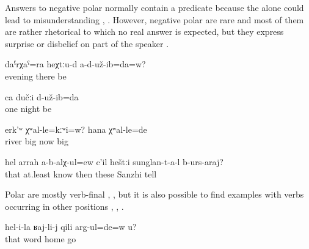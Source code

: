 Answers to negative polar  normally contain a predicate because the  alone could lead to misunderstanding , . However, negative polar  are rare and most of them are rather rhetorical  to which no real answer is expected, but they express surprise or disbelief on part of the speaker . 
%
\begin{exe}
	\ex	\label{ex:Did you not also spend the night there? We stayed one night}
	\begin{xlist}
		\ex	\label{ex:Did you not also spend the night there? We stayed one night@A}
		\gll	daˁrχaˁ=ra	heχtːu-d	a-d-už-ib=da=w?\\
			evening	there	be\\
		\glt	{}

		\ex	\label{ex:Did you not also spend the night there? We stayed one night@B}
		\gll	ca	dučːi	d-už-ib=da\\
			one	night	be\\
		\glt	{}
	\end{xlist}

	\ex	\label{ex:Was the river not big? Now it was big}
	\gll	erk'ʷ	χʷal-le=kːʷi=w? 	hana	χʷal-le=de\\
		river	big 	now	big\\
	\glt	{}

	\ex	\label{ex:‎Don't the Sanzhi people know at least that (story) to tell}
	\gll	hel	arrah	a-b-alχ-ul=ew	c'il	heštːi	sunglan-t-a-l	b-urs-araj?\\
		that	at.least	know	then	these	Sanzhi	tell	\\
	\glt	{}
\end{exe}

Polar  are mostly verb-final , , but it is also possible to find examples with verbs occurring in other positions , , .
%
\begin{exe}
	\ex	\label{ex:Are you going home because of what she said}
	\gll	hel-i-la	ʁaj-li-j	qili	arg-ul=de=w	u?	\\
		that	word	home	go		\\
	\glt	{}
\end{exe}


